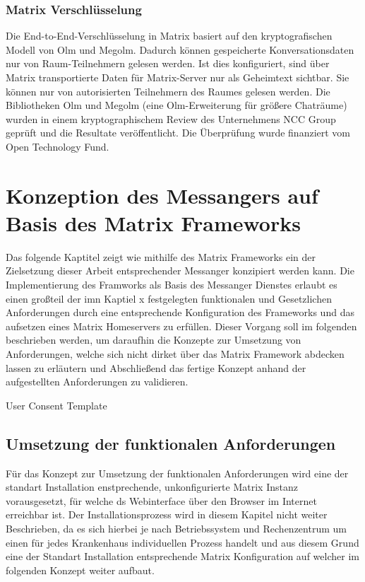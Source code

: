 \subsubsection{Matrix Verschlüsselung}\label{chapter:aemn}
Die End-to-End-Verschlüsselung in Matrix basiert auf den kryptografischen Modell von Olm und Megolm.
 Dadurch können gespeicherte Konversationsdaten nur von Raum-Teilnehmern gelesen werden. Ist dies konfiguriert, sind über Matrix transportierte Daten für Matrix-Server nur als Geheimtext sichtbar. Sie können nur von autorisierten Teilnehmern des Raumes gelesen werden. Die Bibliotheken Olm und Megolm (eine Olm-Erweiterung für größere Chaträume) wurden in einem kryptographischem Review des Unternehmens NCC Group geprüft und die Resultate veröffentlicht. Die Überprüfung wurde finanziert vom Open Technology Fund.

\section{Konzeption des Messangers auf Basis des Matrix Frameworks}\label{chapter:km}
Das folgende Kaptitel zeigt wie mithilfe des Matrix Frameworks ein der Zielsetzung dieser Arbeit entsprechender Messanger konzipiert werden kann. Die Implementierung des Framworks als Basis des Messanger Dienstes erlaubt es einen großteil der imn Kaptiel x festgelegten funktionalen und Gesetzlichen Anforderungen durch eine entsprechende Konfiguration des Frameworks und das aufsetzen eines Matrix Homeservers zu erfüllen. Dieser Vorgang soll im folgenden beschrieben werden, um daraufhin die Konzepte zur Umsetzung von Anforderungen, welche sich nicht dirket über das Matrix Framework abdecken lassen zu erläutern und Abschließend das fertige Konzept anhand der aufgestellten Anforderungen zu validieren.

User Consent Template

\subsection{Umsetzung der funktionalen Anforderungen}\label{chapter:am}
Für das Konzept zur Umsetzung der funktionalen Anforderungen wird eine der standart Installation enstprechende, unkonfigurierte Matrix Instanz vorausgesetzt, für welche ds Webinterface über den Browser im Internet erreichbar ist.  
Der Installationsprozess wird in diesem Kapitel nicht weiter Beschrieben, da es sich hierbei je nach Betriebssystem und Rechenzentrum um einen für jedes Krankenhaus individuellen Prozess handelt und aus diesem Grund eine der Standart Installation entsprechende Matrix Konfiguration auf welcher im folgenden Konzept weiter aufbaut. 

